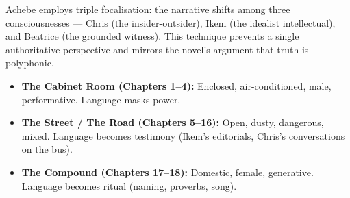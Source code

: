 \documentclass[11pt]{article}
\newcommand{\cle}[1]{{\popxbold\color{popdark}#1}}
\begin{document}
\begin{definition}
Achebe employs \cle{triple focalisation}: the narrative shifts among three consciousnesses — Chris (the insider-outsider), Ikem (the idealist intellectual), and Beatrice (the grounded witness). This technique prevents a single authoritative perspective and mirrors the novel’s argument that truth is polyphonic.
\end{definition}

\begin{aretenir}
\begin{itemize}
\item \textbf{The Cabinet Room (Chapters 1–4):} Enclosed, air-conditioned, male, performative. Language masks power.
\item \textbf{The Street / The Road (Chapters 5–16):} Open, dusty, dangerous, mixed. Language becomes testimony (Ikem’s editorials, Chris’s conversations on the bus).
\item \textbf{The Compound (Chapters 17–18):} Domestic, female, generative. Language becomes ritual (naming, proverbs, song).
\end{itemize}
\end{aretenir}
\end{document}
